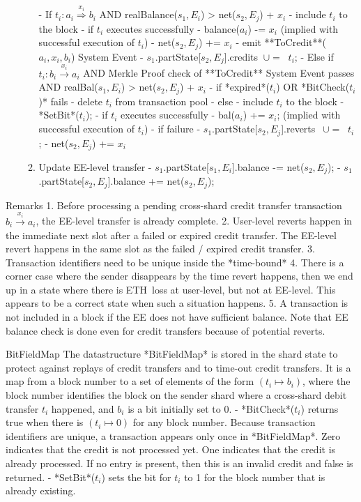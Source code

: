 \documentclass{article}
\newcommand{\eth}[0]{ETH~}
\begin{document}
\begin{enumerate}
\begin{enumerate}
		- If $t_i : a_i \stackrel{x_i}{\Longrightarrow} b_i$ AND realBalance($s_1,E_i$) > net($s_2,E_j$) + $x_i$
			- include $t_i$ to the block
			- if $t_i$ executes successfully 
				- balance($a_i$) -= $x_i$ (implied with successful execution of $t_i$)
				- net($s_2,E_j$) += $x_i$
				- emit **ToCredit**($a_i, x_i, b_i$) System Event
				- $s_1$.partState[$s_2,E_j$].credits $~ \cup= ~$ {$t_i$};
		- Else if $t_i : b_i \stackrel{x_i}{\longrightarrow} a_i$ AND Merkle Proof check of **ToCredit** System Event passes AND realBal($s_1,E_i$) > net($s_2,E_j$) + $x_i$
			- if *expired*($t_i$) OR *BitCheck($t_i$)* fails
				- delete $t_i$ from transaction pool
			- else 
				- include $t_i$ to the block
				- *SetBit*($t_i$);
				- if $t_i$ executes successfully
					- bal($a_i$) += $x_i$; (implied with successful execution of $t_i$)
				- if failure 
					- $s_1$.partState[$s_2,E_j$].reverts $~~\cup=~$ {$t_i$};
					- net($s_2,E_j$) += $x_i$ 
	\item Update EE-level transfer
		- $s_1$.partState[$s_1,E_i$].balance -= net($s_2,E_j$); 
		- $s_1$.partState[$s_2,E_j$].balance += net($s_2,E_j$);
    \end{enumerate}
\end{enumerate}


Remarks
1. Before processing a pending cross-shard credit transfer transaction $b_i \stackrel{x_i}{\longrightarrow} a_i$, the EE-level transfer is already complete. 
2. User-level reverts happen in the immediate next slot after a failed or expired credit transfer. The EE-level revert happens in the same slot as the failed / expired credit transfer.
3. Transaction identifiers need to be unique inside the *time-bound*
4. There is a corner case where the sender disappears by the time revert happens, then we end up in a state where there is \eth loss at user-level, but not at EE-level. This appears to be a correct state when such a  situation happens.
5. A transaction is not included in a block if the EE does not have sufficient balance. Note that EE balance check is done even for credit transfers because of potential reverts.

BitFieldMap
The datastructure *BitFieldMap* is stored in the shard state to protect against replays of credit transfers and to time-out credit transfers. It is a map from a block number to a set of elements of the form $(t_i \mapsto b_i)$, where the block number identifies the block on the sender shard where a cross-shard debit transfer $t_i$ happened, and $b_i$ is a bit initially set to 0.  
- *BitCheck*($t_i$) returns true when there is $(t_i \mapsto 0)$ for any block number. Because transaction identifiers are unique, a transaction appears only once in *BitFieldMap*. Zero indicates that the credit is not processed yet. One indicates that the credit is already processed. If no entry is present, then this is an invalid credit and false is returned.
- *SetBit*($t_i$) sets the bit for $t_i$ to 1 for the block number that is already existing. 
\end{document}
